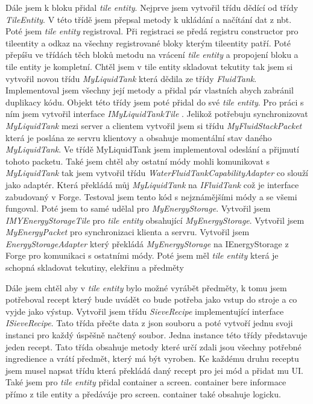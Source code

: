 \documentclass[FM,RP]{tulthesis}
\begin{document}
    Dále jsem k bloku přidal \textit{tile entity}. Nejprve jsem vytvořil třídu dědící od třídy \textit{TileEntity}. V této třídě jsem přepsal metody k ukládání a načítání dat z nbt. Poté jsem \textit{tile entity} registroval. Při registraci se předá registru constructor pro tileentity a odkaz na všechny registrované bloky kterým tileentity patří. Poté přepíšu ve třídách těch bloků metodu na vrácení \textit{tile entity} a propojení bloku a tile entity je kompletní. 
    Chtěl jsem v tile entity skladovat tekutity tak jsem si vytvořil novou třídu  \textit{MyLiquidTank} která dědila ze třídy \textit{FluidTank}. Implementoval jsem všechny její metody a přidal pár vlastních abych zabránil duplikacy kódu. Objekt této třídy jsem poté přidal do své\textit{ tile entity}. Pro práci s ním jsem vytvořil interface \textit{IMyLiquidTankTile} . 
    Jelikož potřebuju synchronizovat \textit{MyLiquidTank} mezi server a clientem vytvořil jsem si třídu  \textit{MyFluidStackPacket} která je poslána ze servru klientovy a obsahuje momentální stav daného \textit{MyLiquidTank}. Ve třídě MyLiquidTank jsem implementoval odeslání a přijmutí tohoto packetu. 
    Také jsem chtěl aby ostatní módy mohli komunikovat s \textit{MyLiquidTank} tak jsem vytvořil třídu \textit{WaterFluidTankCapabilityAdapter} co slouží jako adaptér. Která překládá můj  \textit{MyLiquidTank} na\textit{ IFluidTank} což je interface zabudovaný v Forge. Testoval jsem tento kód s nejznámějšími módy a se všemi fungoval.
    Poté jsem to samé udělal pro \textit{MyEnergyStorage}. Vytvořil jsem  \textit{IMYEnergyStorageTile} pro \textit{tile entity} obsahující  \textit{MyEnergyStorage}.  Vytvořil jsem \textit{MyEnergyPacket} pro synchronizaci klienta a servru. Vytvořil jsem \textit{EnergyStorageAdapter} který překládá \textit{MyEnergyStorage} na IEnergyStorage z Forge pro komunikaci s ostatními módy.
    Poté jsem měl\textit{ tile entity} která je schopná skladovat tekutiny, elekřinu a předměty \begin{comment}
        předměty jsem nikdy nezmínil
\end{comment}
    Dále jsem chtěl aby v\textit{ tile entity} bylo možné vyrábět předměty, k tomu jsem potřeboval recept který bude uvádět co bude potřeba jako vstup do stroje a co vyjde jako výstup. Vytvořil jsem třídu \textit{SieveRecipe} implementující interface \textit{ISieveRecipe}. Tato třída přečte data z json souboru a poté vytvoří jednu svoji instanci pro každý úspěšně načtený soubor. Jedna instance této třídy představuje jeden recept. Tato třída obsahuje metody které určí zdali jsou všechny potřebné ingredience a vrátí předmět, který má být vyroben.
    Ke každému druhu receptu jsem musel napsat třídu která překládá daný recept pro jei mód a přidat mu UI.
    Také jsem pro \textit{tile entity } přidal container a screen. container bere informace přímo z tile entity a předáváje pro screen. container také obsahuje logicku.
    
\end{document}

